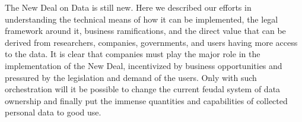 The New Deal on Data is still new.
Here we described our efforts in understanding the technical means of how it can be implemented, the legal framework around it, business ramifications, and the direct value that can be derived from researchers, companies, governments, and users having more access to the data.
It is clear that companies must play the major role in the implementation of the New Deal, incentivized by business opportunities and pressured by the legislation and demand of the users.
Only with such orchestration will it be possible to change the current feudal system of data ownership and finally put the immense quantities and capabilities of collected personal data to good use. 

